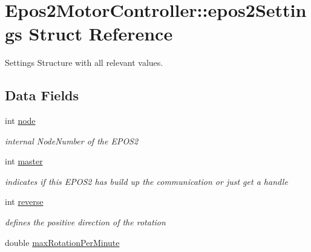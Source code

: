 \hypertarget{structEpos2MotorController_1_1epos2Settings}{\section{Epos2\-Motor\-Controller\-:\-:epos2\-Settings Struct Reference}
\label{structEpos2MotorController_1_1epos2Settings}
}


Settings Structure with all relevant values.  


\subsection*{Data Fields}
\begin{DoxyCompactItemize}
\item 
\hypertarget{structEpos2MotorController_1_1epos2Settings_ab8f18d3df17e8de9ed5250a3e53292c6}{int \hyperlink{structEpos2MotorController_1_1epos2Settings_ab8f18d3df17e8de9ed5250a3e53292c6}{node}}\label{structEpos2MotorController_1_1epos2Settings_ab8f18d3df17e8de9ed5250a3e53292c6}

\begin{DoxyCompactList}\small\item\em internal Node\-Number of the E\-P\-O\-S2 \end{DoxyCompactList}\item 
\hypertarget{structEpos2MotorController_1_1epos2Settings_abf2ed391ef59f5d99d7e6a9300f59ac3}{int \hyperlink{structEpos2MotorController_1_1epos2Settings_abf2ed391ef59f5d99d7e6a9300f59ac3}{master}}\label{structEpos2MotorController_1_1epos2Settings_abf2ed391ef59f5d99d7e6a9300f59ac3}

\begin{DoxyCompactList}\small\item\em indicates if this E\-P\-O\-S2 has build up the communication or just get a handle \end{DoxyCompactList}\item 
\hypertarget{structEpos2MotorController_1_1epos2Settings_af14c93f519f8ecee21ab4eddfb2a2230}{int \hyperlink{structEpos2MotorController_1_1epos2Settings_af14c93f519f8ecee21ab4eddfb2a2230}{reverse}}\label{structEpos2MotorController_1_1epos2Settings_af14c93f519f8ecee21ab4eddfb2a2230}

\begin{DoxyCompactList}\small\item\em defines the positive direction of the rotation \end{DoxyCompactList}\item 
\hypertarget{structEpos2MotorController_1_1epos2Settings_a7bc89f766fbe9abcb503572714422658}{double \hyperlink{structEpos2MotorController_1_1epos2Settings_a7bc89f766fbe9abcb503572714422658}{max\-Rotation\-Per\-Minute}}\label{structEpos2MotorController_1_1epos2Settings_a7bc89f766fbe9abcb503572714422658}


\end{DoxyCompactItemize}
